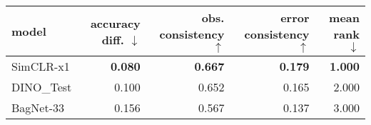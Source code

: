 \begin{tabular}{lrrrr}
\toprule
     model & accuracy diff. $\downarrow$ & obs. consistency $\uparrow$ & error consistency $\uparrow$ & mean rank $\downarrow$ \\
\midrule
 SimCLR-x1 &              \textbf{0.080} &              \textbf{0.667} &               \textbf{0.179} &         \textbf{1.000} \\
DINO\_Test &                       0.100 &                       0.652 &                        0.165 &                  2.000 \\
 BagNet-33 &                       0.156 &                       0.567 &                        0.137 &                  3.000 \\
\bottomrule
\end{tabular}

